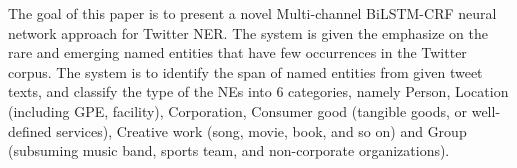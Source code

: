 The goal of this paper is to present a novel Multi-channel BiLSTM-CRF neural network approach for Twitter NER. The system is given the emphasize on the rare and emerging named entities that have few occurrences in the Twitter corpus. The system is to identify the span of named entities from given tweet texts, and classify the type of the NEs into 6 categories, namely Person, Location (including GPE, facility), Corporation, Consumer good (tangible goods, or well-defined services), Creative work (song, movie, book, and so on) and Group (subsuming music band, sports team, and non-corporate organizations).


